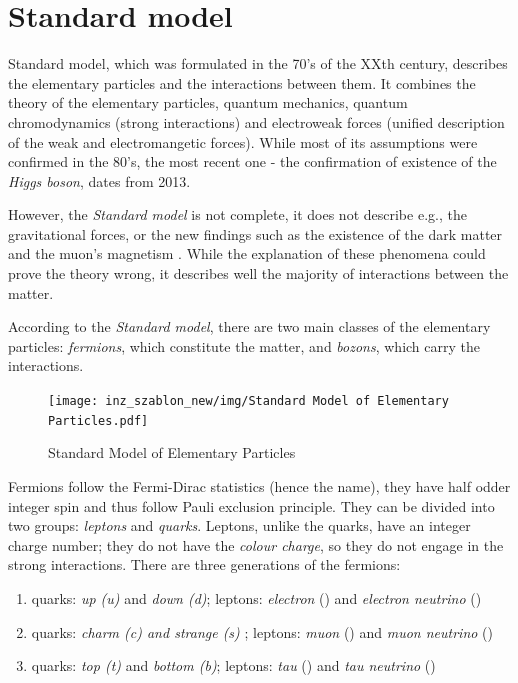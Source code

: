 \pagestyle{fancy}
\section{Standard model} \thispagestyle{fancy}

Standard model, which was formulated in the 70's of the XXth century, describes the elementary particles and the interactions between them. It combines the theory of the elementary particles, quantum mechanics, quantum chromodynamics (strong interactions) and electroweak forces (unified description of the weak and electromangetic forces). While most of its assumptions were confirmed in the 80's, the most recent one - the confirmation of existence of the \emph{Higgs boson}, dates from 2013. \cite{zbroszczyk}

However, the \emph{Standard model} is not complete, it does not describe e.g., the gravitational forces, or the new findings such as the existence of the dark matter and the muon's magnetism \cite{standard model}. While the explanation of these phenomena could prove the theory wrong, it describes well the majority of interactions between the matter.

According to the \emph{Standard model}, there are two main classes of the elementary particles: \emph{fermions}, which constitute the matter, and  \emph{bozons}, which carry the interactions. 

\begin{figure}[H]
    \centering
    \texttt{[image: inz\_szablon\_new/img/Standard Model of Elementary Particles.pdf]}
    \caption{Standard Model of Elementary Particles \cite{wiki}}
    \label{cbm_setup}
 \end{figure}

Fermions follow the Fermi-Dirac statistics (hence the name), they have half odder integer spin and thus follow Pauli exclusion principle. They can be divided into two groups: \emph{leptons} and \emph{quarks}. Leptons, unlike the quarks, have an integer charge number; they do not have the \emph{colour charge}, so they do not engage in the strong interactions. There are three generations of the fermions: 
\begin{enumerate}[label=\Roman*.]
    \item quarks: \emph{up (u)} and \emph{down (d)}; leptons: \emph{electron} (\Pem) and \emph{electron neutrino} (\Pgne)
    \item quarks: \emph{charm (c) and \emph{strange (s)} }; leptons: \emph{muon} (\Pgmm) and \emph{muon neutrino} (\Pgngm) 
    \item quarks: \emph{top (t)} and \emph{bottom (b)}; leptons: \emph{tau} (\Pgtm) and \emph{tau neutrino} (\Pgngt)
\end{enumerate}

